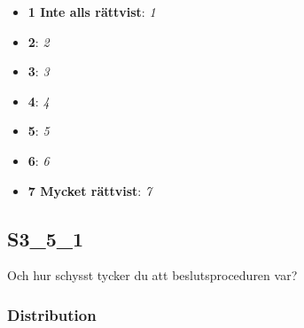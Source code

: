 \documentclass[]{book}
\providecommand{\tightlist}{%
  \setlength{\itemsep}{0pt}\setlength{\parskip}{0pt}}
\begin{document}
\begin{itemize}
\tightlist
\item
  \textbf{1 Inte alls rättvist}: \emph{1}
\item
  \textbf{2}: \emph{2}
\item
  \textbf{3}: \emph{3}
\item
  \textbf{4}: \emph{4}
\item
  \textbf{5}: \emph{5}
\item
  \textbf{6}: \emph{6}
\item
  \textbf{7 Mycket rättvist}: \emph{7}
\end{itemize}

\subsection{S3\_5\_1}\label{S3_5_1}

Och hur schysst tycker du att beslutsproceduren var?

\subsubsection{Distribution}\label{S3_5_1_distribution}
\end{document}

